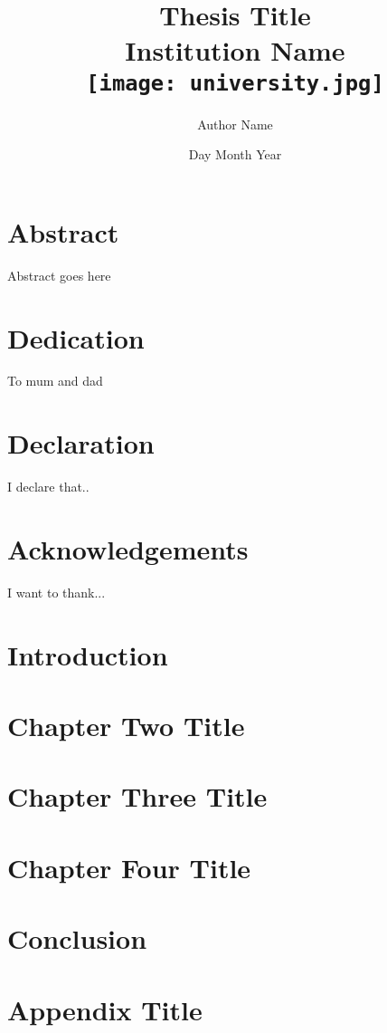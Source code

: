\documentclass[12pt]{report}
\begin{document}
\title{
	{Thesis Title}\\
	{\large Institution Name}\\
	{\texttt{[image: university.jpg]}}
}
\author{Author Name}
\date{Day Month Year}

\chapter*{Abstract}
Abstract goes here

\chapter*{Dedication}
To mum and dad

\chapter*{Declaration}
I declare that..

\chapter*{Acknowledgements}
I want to thank...

\tableofcontents

\chapter{Introduction}


\chapter{Chapter Two Title}


\chapter{Chapter Three Title}


\chapter{Chapter Four Title}


\chapter{Conclusion}


\appendix
\chapter{Appendix Title}

\end{document}
